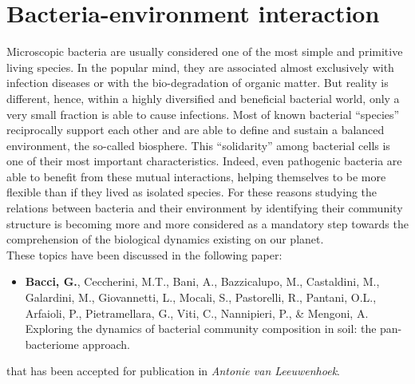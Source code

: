 \logvartrue
\chapter{Bacteria-environment interaction}
Microscopic bacteria are usually considered one of the most simple and primitive living species. In the popular mind, they are associated almost exclusively with infection diseases or with the bio-degradation of organic matter. But reality is different, hence, within a highly diversified and beneficial bacterial world, only a very small fraction is able to cause infections. Most of known bacterial ``species'' reciprocally support each other and are able to define and sustain a balanced environment, the so-called biosphere. This ``solidarity'' among bacterial cells is one of their  most important characteristics. Indeed, even pathogenic bacteria are able to benefit from these mutual interactions, helping themselves to be more flexible than if they lived as isolated species. For these reasons studying the relations between bacteria and their environment by identifying their community structure is becoming more and more considered as a mandatory step towards the comprehension of the biological dynamics existing on our planet.\\
These topics have been discussed in the following paper:
\vspace{-2mm}
\begin{itemize}[nosep]
\item \textbf{Bacci, G.}, Ceccherini, M.T., Bani, A., Bazzicalupo, M., Castaldini, M., Galardini, M., Giovannetti, L., Mocali, S., Pastorelli, R., Pantani, O.L., Arfaioli, P., Pietramellara, G., Viti, C., Nannipieri, P., \& Mengoni, A. Exploring the dynamics of bacterial community composition in soil: the pan-bacteriome approach.
\end{itemize}
that has been accepted for publication in \textit{Antonie van Leeuwenhoek}.

